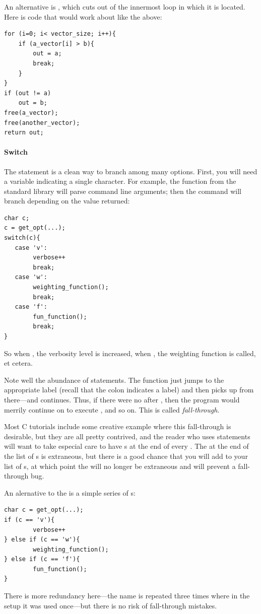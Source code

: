 \documentclass[12pt]{article}
\makeatletter
\def\ttind#1{\index{#1@\cinline{#1}}\cinline{#1}}
\makeatother
\begin{document}
An alternative is \ttind{break}, which cuts out of the innermost loop in
which it is located. Here is code that would work about like the above:
\begin{lstlisting}
for (i=0; i< vector_size; i++){
    if (a_vector[i] > b){
        out = a;
        break;
    }
}
if (out != a)
    out = b;
free(a_vector);
free(another_vector);
return out;
\end{lstlisting}

\paragraph{Switch} The \ttind{switch} statement is a clean way to
branch among many options. First, you will need a variable indicating
a single character. For example, the  function from the
standard library will parse command line arguments; then the 
command will branch depending on the value returned:
\begin{lstlisting}
char c;
c = get_opt(...);
switch(c){
   case 'v':
        verbose++
        break;
   case 'w':    
        weighting_function();
        break;
   case 'f':      
        fun_function();
        break;
}
\end{lstlisting}
So when 
, the verbosity level is increased,
when , the weighting function is called, 
et cetera.

Note well the abundance of  statements.  The 
function just jumps to the appropriate label (recall that the colon
indicates a label) and then picks up from there---and continues. Thus,
if there were no  after , then the program
would merrily continue on to execute , and so
on. This is called {\sl fall-through}.

Most C tutorials include some creative example where this
fall-through is desirable, but they are all pretty contrived, and the
reader who uses  statements will want to take especial care
to have s at the end of every .  The 
at the end of the list of s is extraneous, but there is a good
chance that you will add to your list of s, at which point
the  will no longer be extraneous and will prevent a fall-through bug.

An alernative to the  is a simple series of s:
\begin{lstlisting}
char c = get_opt(...);
if (c == 'v'){
        verbose++
} else if (c == 'w'){
        weighting_function();
} else if (c == 'f'){
        fun_function();
}
\end{lstlisting}
There is more redundancy here---the name  is repeated three times
where in the  setup it was used once---but there is no risk
of fall-through mistakes.
\end{document}
